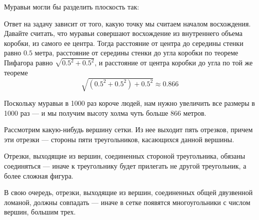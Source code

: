 ﻿
\begin{itemize}
\itA Муравьи могли бы разделить плоскость так:

\begin{center}\end{center}

\itB Ответ на задачу зависит от того, какую точку мы считаем началом восхождения.
Давайте считать, что муравьи совершают восхождение из внутреннего объема коробки, из самого ее центра.
Тогда расстояние от центра до середины стенки равно $0.5$ метра, расстояние от середины стенки до угла
коробки по теореме Пифагора равно $\sqrt{0.5^2 + 0.5^2}$, и расстояние от центра коробки до угла по той же теореме
$$\sqrt{(0.5^2 + 0.5^2) + 0.5^2} \approx 0.866$$

Поскольку муравьи в 1000 раз короче людей, нам нужно увеличить все размеры в 1000 раз --- и мы 
получим высоту холма чуть больше 866 метров.

\itC Рассмотрим какую-нибудь вершину сетки. Из нее выходит пять отрезков, причем эти отрезки --- стороны пяти 
треугольников, касающихся данной вершины. 

\begin{center}\end{center}

Отрезки, выходящие из вершин, соединенных стороной треугольника, обязаны соединяться ---
иначе к треугольнику будет прилегать не другой треугольник, а более сложная фигура.

\begin{center}\end{center}

В свою очередь, отрезки, выходящие из вершин, соединенных общей двузвенной ломаной,
должны совпадать --- иначе в сетке появятся многоугольники с числом вершин, большим трех.


\end{itemize}
